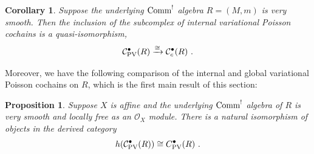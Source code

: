 \documentclass[11pt]{amsart}
\numberwithin{equation}{section}
\newtheorem{prop}[theo]{Proposition}
\newtheorem{coro}[theo]{Corollary}
\theoremstyle{definition}
\newcommand{\mc}{\mathcal}
\newcommand{\Comm}{{\textup{Comm}}}
\newcommand{\PV}{{{\textup{PV}}}}
\newcommand{\0}{{\textbf{0}}}
\begin{document}
\begin{coro}\label{GOequivchintcoro} Suppose the underlying $\Comm^!$ algebra $R=(M,m)$ is very smooth. Then the inclusion of the subcomplex of internal variational Poisson cochains is a quasi-isomorphism,
	\[\mc C^\bullet_\PV(R) \xrightarrow{\cong} \mc C_c^\bullet(R) \ .\]
\end{coro}



Moreover, we have the following comparison of the internal and global variational Poisson cochains on $R$, which is the first main result of this section:

\begin{prop}\label{prop:deRham of internal PV}
Suppose $X$ is affine and the underlying $\Comm^!$ algebra of $R$ is very smooth and locally free as an $\mc O_X$ module. There is a natural isomorphism of objects in the derived category
\[ h(\mc C^\bullet_\PV(R)) \cong C^\bullet_\PV(R) \ . \]
\end{prop}
\end{document}
